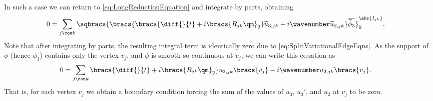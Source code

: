 In such a case we can return to \eqref{eq:LongReductionEquation} and integrate by parts, obtaining 
\begin{align*}
	0 &= \sum_{j\con k} \sqbracs{ \bracs{ \bracs{\diff{}{t} + i\bracs{R_{jk}\qm}_2}\widetilde{u}_{3,jk} - i\wavenumber\widetilde{u}_{2,jk} }\overline{\widetilde{\phi}_3} }_0^{\abs{I_{jk}}}.
\end{align*}
Note that after integrating by parts, the resulting integral term is identically zero due to \eqref{eq:SplitVariationalEdgeEqns}.
As the support of $\phi$ (hence $\phi_3$) contains only the vertex $v_j$, and $\phi$ is smooth so continuous at $v_j$, we can write this equation as
\begin{align*}
	0 &= \sum_{j\con k} \bracs{\diff{}{t} + i\bracs{R_{jk}\qm}_2}u_{3,jk}\bracs{v_j} - i\wavenumber u_{2,jk}\bracs{v_j}.
\end{align*}
That is, for each vertex $v_j$ we obtain a boundary condition forcing the sum of the values of $u_3$, $u_3'$, and $u_2$ at $v_j$ to be zero. \newline

